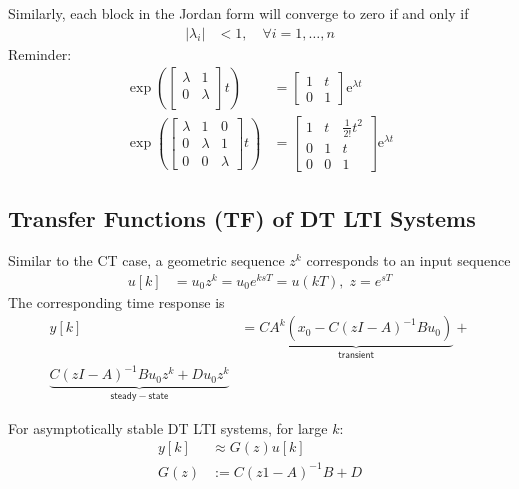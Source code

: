 Similarly, each block in the Jordan form will converge to zero if and only if
\noindent\begin{align*}
    |\lambda_i| & <1,\quad\forall i=1,\ldots,n
\end{align*}
Reminder:
\noindent\begin{align*}
    \left.\exp\left(\begin{bmatrix}\lambda&1\\ 0&\lambda\\\end{bmatrix}\right.t\right)               & =\begin{bmatrix}1&t\\0&1\end{bmatrix}\text{e}^{\lambda t}                          \\
    \left.\exp\left(\begin{bmatrix}\lambda&1&0\\0&\lambda&1\\0&0&\lambda\end{bmatrix}\right.t\right) & =\begin{bmatrix}1&t&\frac{1}{2!}t^2\\0&1&t\\0&0&1\end{bmatrix}\text{e}^{\lambda t}
\end{align*}
%
\subsection{Transfer Functions (TF) of DT LTI Systems}

Similar to the CT case, a geometric sequence $z^k$ corresponds to an input sequence
\noindent\begin{align*}
    u[k] & =u_0z^k=u_0e^{ksT}=u(kT), \; z=e^{sT}
\end{align*}
The corresponding time response is
\noindent\begin{align*}
    y[k] & = \underbrace{CA^k(x_0-C(zI-A)^{-1}Bu_0)}_{\mathsf{transient}}+ \\\underbrace{C(zI-A)^{-1}Bu_0z^k+Du_0z^k}_{\mathsf{steady-state}}
\end{align*}

For asymptotically stable DT LTI systems, for large $k$:
\noindent\begin{align*}
    y[k] & \approx G(z)u[k]  \\
    G(z) & :=C(z1-A)^{-1}B+D
\end{align*}
